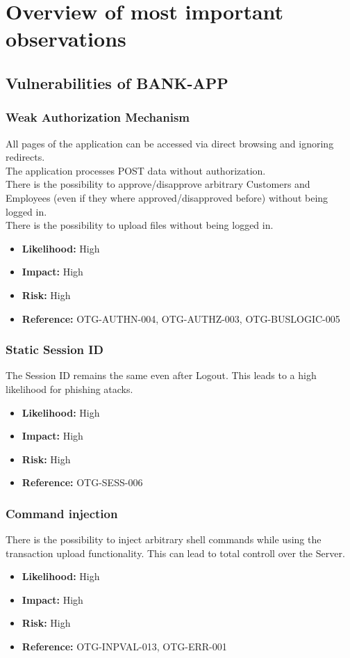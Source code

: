 \chapter{Overview of most important observations}
\section{Vulnerabilities of BANK-APP}
\subsection{Weak Authorization Mechanism}
All pages of the application can be accessed via direct browsing and ignoring redirects.\\
The application processes POST data without authorization.\\
There is the possibility to approve/disapprove arbitrary Customers and Employees (even if they where approved/disapproved before) without being logged in.\\
There is the possibility to upload files without being logged in.\\
\begin{itemize}
	\item \textbf{Likelihood:} High
	\item \textbf{Impact:} High
	\item \textbf{Risk:} High
	\item \textbf{Reference:} OTG-AUTHN-004, OTG-AUTHZ-003, OTG-BUSLOGIC-005
\end{itemize}
\subsection{Static Session ID}
The Session ID remains the same even after Logout.
This leads to a high likelihood for phishing atacks.
\begin{itemize}
	\item \textbf{Likelihood:} High
	\item \textbf{Impact:} High
	\item \textbf{Risk:} High
	\item \textbf{Reference:} OTG-SESS-006
\end{itemize}
\subsection{Command injection}
There is the possibility to inject arbitrary shell commands while using the transaction upload functionality.
This can lead to total controll over the Server.
\begin{itemize}
	\item \textbf{Likelihood:} High
	\item \textbf{Impact:} High
	\item \textbf{Risk:} High
	\item \textbf{Reference:} OTG-INPVAL-013, OTG-ERR-001
\end{itemize}

